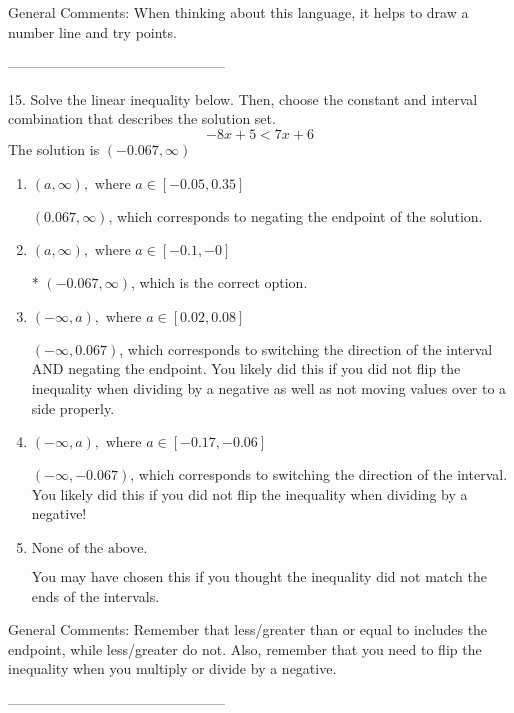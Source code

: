 \documentclass{extbook}[14pt]
\begin{document}
General Comments: When thinking about this language, it helps to draw a number line and try points.

-----------------------------------------------

15. Solve the linear inequality below. Then, choose the constant and interval combination that describes the solution set.
\[ -8x + 5 < 7x + 6 \] 
The solution is $ (-0.067, \infty) $ 

\begin{enumerate}[label=\Alph*.] 
\item $ (a, \infty), \text{ where } a \in [-0.05, 0.35] $ 

  $(0.067, \infty)$, which corresponds to negating the endpoint of the solution. 
\item $ (a, \infty), \text{ where } a \in [-0.1, -0] $ 

 * $(-0.067, \infty)$, which is the correct option. 
\item $ (-\infty, a), \text{ where } a \in [0.02, 0.08] $ 

  $(-\infty, 0.067)$, which corresponds to switching the direction of the interval AND negating the endpoint. You likely did this if you did not flip the inequality when dividing by a negative as well as not moving values over to a side properly. 
\item $ (-\infty, a), \text{ where } a \in [-0.17, -0.06] $ 

  $(-\infty, -0.067)$, which corresponds to switching the direction of the interval. You likely did this if you did not flip the inequality when dividing by a negative! 
\item $ \text{None of the above}. $ 

 You may have chosen this if you thought the inequality did not match the ends of the intervals. 
\end{enumerate} 
 
General Comments: Remember that less/greater than or equal to includes the endpoint, while less/greater do not. Also, remember that you need to flip the inequality when you multiply or divide by a negative.

-----------------------------------------------
\end{document}
